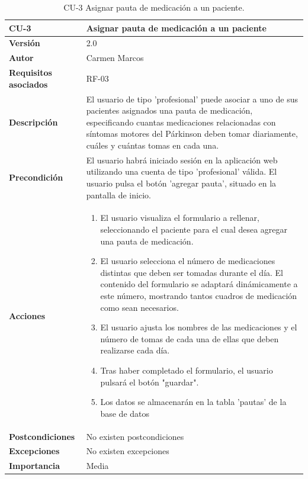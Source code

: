 \begin{table}[p]
	\centering
	\begin{tabularx}{\linewidth}{ p{} p{} }
		\toprule
		\textbf{CU-3}    & \textbf{Asignar pauta de medicación a un paciente}\\
		\toprule
		\textbf{Versión}              & 2.0    \\
		\textbf{Autor}                & Carmen Marcos \\
		\textbf{Requisitos asociados} & RF-03 \\
		\textbf{Descripción}          & El usuario de tipo 'profesional' puede asociar a uno de sus pacientes asignados una pauta de medicación, especificando cuantas medicaciones relacionadas con síntomas motores del Párkinson deben tomar diariamente, cuáles y cuántas tomas en cada una.
        \\
		\textbf{Precondición}         & El usuario habrá iniciado sesión en la aplicación web utilizando una cuenta de tipo 'profesional' válida. El usuario pulsa el botón 'agregar pauta', situado en la pantalla de inicio.
		\\
		\textbf{Acciones}             & \begin{enumerate} \def\labelenumi{\arabic{enumi}.}
	\tightlist
		\item El usuario visualiza el formulario a rellenar, seleccionando el paciente para el cual desea agregar una pauta de medicación.
        \item El usuario selecciona el número de medicaciones distintas que deben ser tomadas durante el día. El contenido del formulario se adaptará dinámicamente a este número, mostrando tantos cuadros de medicación como sean necesarios.
        \item El usuario ajusta los nombres de las medicaciones y el número de tomas de cada una de ellas que deben realizarse cada día.
        \item Tras haber completado el formulario, el usuario pulsará el botón "guardar".
        \item Los datos se almacenarán en la tabla 'pautas' de la base de datos
		\end{enumerate}\\
		\textbf{Postcondiciones}        & 		No existen postcondiciones
  \\
		\textbf{Excepciones}          & No existen excepciones \\
		\textbf{Importancia}          & Media \\
		\bottomrule
	\end{tabularx}
	\caption{CU-3 Asignar pauta de medicación a un paciente.}
        \label{tab:CU-3}
\end{table}

